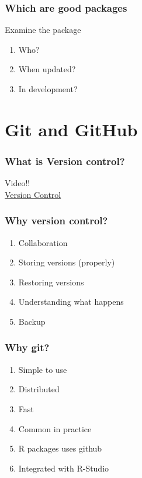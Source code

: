 \documentclass{beamer}
\begin{document}
\begin{frame}
	\frametitle{Which are good packages}
	\centerline{Examine the package}
	\begin{center}
		\begin{enumerate}
			\item Who?			
			\item When updated?			
			\item In development?
		\end{enumerate}
	\end{center}
\end{frame}

\section{Git and GitHub} 

\begin{frame}
	\frametitle{What is Version control?}
	\begin{center}
	Video!! \\
	\href{https://vimeo.com/41027679}{Version Control}
	\end{center}
\end{frame}

\begin{frame}
	\frametitle{Why version control?}
	\begin{center}
		\begin{enumerate}
			\item Collaboration
			\item Storing versions (properly)
			\item Restoring versions
			\item Understanding what happens
			\item Backup
		\end{enumerate}
	\end{center}
\end{frame}

\begin{frame}
	\frametitle{Why git?}
	\begin{center}
		\begin{enumerate}
			\item Simple to use
			\item Distributed
			\item Fast
			\item Common in practice
			\item R packages uses github
			\item Integrated with R-Studio
		\end{enumerate}
	\end{center}
\end{frame}
\end{document}

